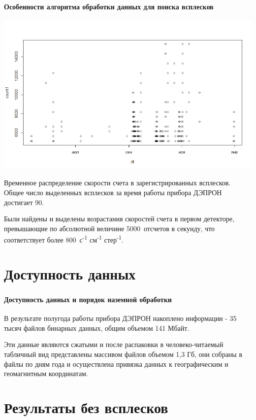 \documentclass[t, aspectratio=43]{beamer}
\begin{document}
\begin{frame}	
	\frametitle{\insertsection} 
	\framesubtitle{Особенности алгоритма обработки данных для поиска всплесков}
	\centering
	
	\includegraphics[width=0.7\linewidth]{images/Flash/Rplot03.png}
	
{\tiny 	Временное распределение скорости счета в зарегистрированных всплесков. Общее число выделенных всплесков за время работы прибора ДЭПРОН достигает 90.
	
	
	 \begin{flushleft}
	 	Были найдены и выделены возрастания скоростей счета в первом детекторе, превышающие по абсолютной величине 5000~отсчетов в секунду, что соответствует более 800~с\textsuperscript{-1} см\textsuperscript{-1} стер\textsuperscript{-1}.  		
 \end{flushleft}
}
\end{frame}

\section{Доступность данных}

\begin{frame}	
\frametitle{\insertsection} 
\framesubtitle{Доступность данных и порядок наземной обработки}
В результате полугода работы прибора ДЭПРОН накоплено информации - 35 тысяч файлов бинарных данных, общим объемом 141 Мбайт.

 Эти данные являются сжатыми и после распаковки в человеко-читаемый табличный вид представлены массивом файлов объемом 1,3 Гб, они собраны в файлы по дням года и осуществлена привязка данных к географическим и геомагнитным координатам.
\end{frame}

\section{Результаты без всплесков}
\end{document}
